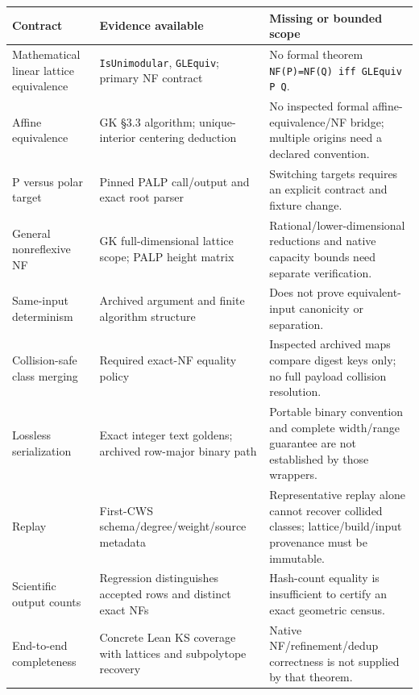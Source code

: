 \documentclass[11pt,a4paper,oneside]{report}
\begin{document}
\begin{longtable}[]{@{}
  >{\raggedright\arraybackslash}p{}
  >{\raggedright\arraybackslash}p{}
  >{\raggedright\arraybackslash}p{}@{}}
\toprule\noalign{}
\begin{minipage}[b]{\linewidth}\raggedright
Contract
\end{minipage} & \begin{minipage}[b]{\linewidth}\raggedright
Evidence available
\end{minipage} & \begin{minipage}[b]{\linewidth}\raggedright
Missing or bounded scope
\end{minipage} \\
\midrule\noalign{}
\endhead
\bottomrule\noalign{}
\endlastfoot
Mathematical linear lattice equivalence &
\texttt{IsUnimod\allowbreak{}ular}, \texttt{GLEquiv}; primary NF
contract & No formal theorem
\texttt{NF(\allowbreak{}P)\allowbreak{}=\allowbreak{}NF(\allowbreak{}Q)\allowbreak{} iff GLEquiv P Q}. \\
Affine equivalence & GK §3.3 algorithm; unique-interior centering
deduction & No inspected formal
affine-\allowbreak{}equivale\allowbreak{}nce/\allowbreak{}NF bridge;
multiple origins need a declared convention. \\
P versus polar target & Pinned PALP call/\allowbreak{}output and exact
root parser & Switching targets requires an explicit contract and
fixture change. \\
General nonreflexive NF & GK full-dimensional lattice scope; PALP height
matrix &
Rational\allowbreak{}/\allowbreak{}lower-\allowbreak{}dimensio\allowbreak{}nal
reductions and native capacity bounds need separate verification. \\
Same-input determinism & Archived argument and finite algorithm
structure & Does not prove equivalent-input canonicity or separation. \\
Collision-safe class merging & Required exact-NF equality policy &
Inspected archived maps compare digest keys only; no full payload
collision resolution. \\
Lossless serialization & Exact integer text goldens; archived row-major
binary path & Portable binary convention and complete
width/\allowbreak{}range guarantee are not established by those
wrappers. \\
Replay & First-CWS
schema/\allowbreak{}degree/\allowbreak{}weight/\allowbreak{}source
metadata & Representative replay alone cannot recover collided classes;
lattice/\allowbreak{}build/\allowbreak{}input provenance must be
immutable. \\
Scientific output counts & Regression distinguishes accepted rows and
distinct exact NFs & Hash-count equality is insufficient to certify an
exact geometric census. \\
End-to-end completeness & Concrete Lean KS coverage with lattices and
subpolytope recovery & Native
NF/\allowbreak{}refineme\allowbreak{}nt/\allowbreak{}dedup correctness
is not supplied by that theorem. \\
\end{longtable}
\end{document}
